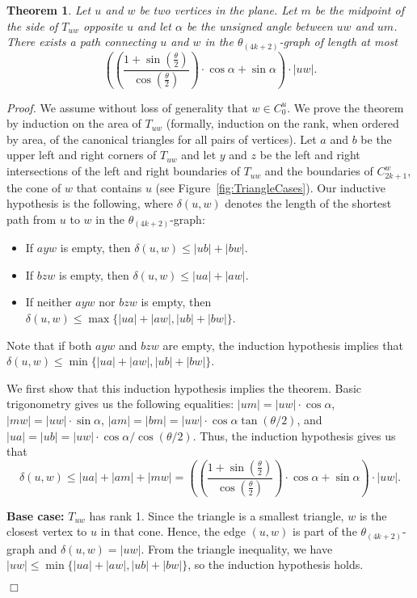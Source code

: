 \documentclass[12pt]{article}
\newtheorem{theo}[defin]{Theorem}
\newenvironment{theorem}{\begin{theo} \sl}{\end{theo}}
\newenvironment{proof}{\emph{Proof.}}{\hfill $\Box$\\}
\newcommand{\graph}[1]{\ensuremath{\theta_{(4 k + #1)}}-graph\xspace}
\newcommand{\canon}[2]{\ensuremath{T_{#1 #2}}}
\begin{document}
\begin{theorem}
  \label{theo:PathLength}
  Let $u$ and $w$ be two vertices in the plane. Let $m$ be the midpoint of the side of \canon{u}{w} opposite $u$ and let $\alpha$ be the unsigned angle between $u w$ and $u m$. There exists a path connecting $u$ and $w$ in the \graph{2} of length at most \[\left( \left(\frac{1 + \sin \left(\frac{\theta}{2}\right)}{\cos \left(\frac{\theta}{2}\right)} \right) \cdot \cos \alpha + \sin \alpha \right) \cdot |u w|.\] 
\end{theorem}
\begin{proof}
  We assume without loss of generality that $w \in C_0^u$. We prove the theorem by induction on the area of $\canon{u}{w}$ (formally, induction on the rank, when ordered by area, of the canonical triangles for all pairs of vertices). Let $a$ and $b$ be the upper left and right corners of $\canon{u}{w}$ and let $y$ and $z$ be the left and right intersections of the left and right boundaries of $\canon{u}{w}$ and the boundaries of $C_{2k+1}^w$, the cone of $w$ that contains $u$ (see Figure~\ref{fig:TriangleCases}). Our inductive hypothesis is the following, where $\delta(u,w)$ denotes the length of the shortest path from $u$ to $w$ in the \graph{2}:
  \begin{itemize}
    \item If $a y w$ is empty, then $\delta(u, w) \leq |u b| + |b w|$.
    \item If $b z w$ is empty, then $\delta(u, w) \leq |u a| + |a w|$.
    \item If neither $a y w$ nor $b z w$ is empty, then $\delta(u, w) \leq \max\{|u a| + |a w|, |u b| + |b w|\}$. 
  \end{itemize}
  Note that if both $a y w$ and $b z w$ are empty, the induction hypothesis implies that $\delta(u, w) \leq \min\{|u a| + |a w|, |u b| + |b w|\}$. 

  We first show that this induction hypothesis implies the theorem. Basic trigonometry gives us the following equalities: $|u m| = |u w| \cdot \cos \alpha$, $|m w| = |u w| \cdot \sin \alpha$, $|a m| = |b m| = |u w| \cdot \cos \alpha \tan (\theta/2)$, and $|u a| = |u b| = |u w| \cdot \cos \alpha / \cos (\theta/2)$. Thus, the induction hypothesis gives us that \[\delta(u, w) \leq|u a| + |a m| + |m w| = \left( \left(\frac{1 + \sin \left(\frac{\theta}{2}\right)}{\cos \left(\frac{\theta}{2}\right)} \right) \cdot \cos \alpha + \sin \alpha \right) \cdot |u w|.\] 

  \textbf{Base case:} $\canon{u}{w}$ has rank 1. Since the triangle is a smallest triangle, $w$ is the closest vertex to $u$ in that cone. Hence, the edge $(u,w)$ is part of the \graph{2} and $\delta(u, w) = |u w|$. From the triangle inequality, we have $|u w| \leq \min\{|u a| + |a w|, |u b| + |b w|\}$, so the induction hypothesis holds.


\end{proof}
\end{document}
